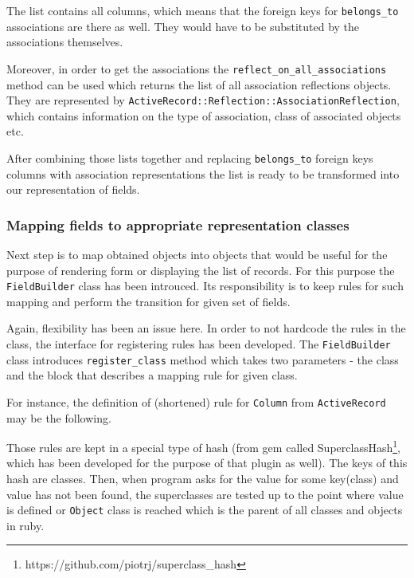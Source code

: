         The list contains all columns, which means that the foreign keys for \texttt{belongs\_to} associations
        are there as well. They would have to be substituted by the associations themselves.
        
        Moreover, in order to get the associations the \texttt{reflect\_on\_all\_associations} method can be used which 
        returns the list of all association reflections objects. They are represented by 
        \texttt{ActiveRecord::Reflection::AssociationReflection}, which contains information on the type of
        association, class of associated objects etc.
        
        After combining those lists together and replacing \texttt{belongs\_to} foreign keys columns with association
        representations the list is ready to be transformed into our representation of fields.

      \subsubsection{Mapping fields to appropriate representation classes}
        Next step is to map obtained objects into objects that would be useful for the purpose of rendering 
        form or displaying the list of records. For this purpose the \texttt{FieldBuilder} class has been introuced.
        Its responsibility is to keep rules for such mapping and perform the transition for given set of 
        fields. 
        
        Again, flexibility has been an issue here. In order to not hardcode the rules in the class, the interface for
        registering rules has been developed. The \texttt{FieldBuilder} class introduces \texttt{register\_class}
        method which takes two parameters - the class and the block that describes a mapping rule for given class.
        
        For instance, the definition of (shortened) rule for \texttt{Column} from \texttt{ActiveRecord} may be the
        following.
        
        
    
        Those rules are kept in a special type of hash (from gem called 
        SuperclassHash\footnote{https://github.com/piotrj/superclass\_hash}, which has been developed 
        for the purpose of that plugin as well). The keys of this hash are classes. Then, when program
        asks for the value for some key(class) and value has not been found, the superclasses are tested up
        to the point where value is defined or \texttt{Object} class is reached which is the parent of all classes
        and objects in ruby.
        
